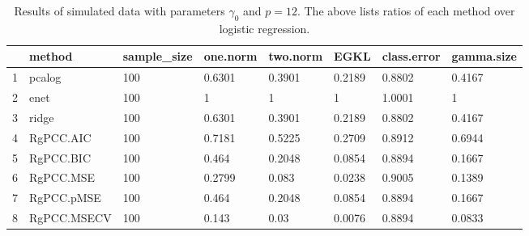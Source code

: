 \begin{table}[ht]
\centering
\begin{tabular}{rlllllll}
  \hline
 & method & sample\_size & one.norm & two.norm & EGKL & class.error & gamma.size \\ 
  \hline
1 & pcalog & 100 & 0.6301 & 0.3901 & 0.2189 & 0.8802 & 0.4167 \\ 
  2 & enet & 100 & 1 & 1 & 1 & 1.0001 & 1 \\ 
  3 & ridge & 100 & 0.6301 & 0.3901 & 0.2189 & 0.8802 & 0.4167 \\ 
  4 & RgPCC.AIC & 100 & 0.7181 & 0.5225 & 0.2709 & 0.8912 & 0.6944 \\ 
  5 & RgPCC.BIC & 100 & 0.464 & 0.2048 & 0.0854 & 0.8894 & 0.1667 \\ 
  6 & RgPCC.MSE & 100 & 0.2799 & 0.083 & 0.0238 & 0.9005 & 0.1389 \\ 
  7 & RgPCC.pMSE & 100 & 0.464 & 0.2048 & 0.0854 & 0.8894 & 0.1667 \\ 
  8 & RgPCC.MSECV & 100 & 0.143 & 0.03 & 0.0076 & 0.8894 & 0.0833 \\ 
   \hline
\end{tabular}
\caption{Results of simulated data with parameters $\gamma_0$ and $p =12$. The above lists ratios of each method over logistic regression.} 
\label{fig-0-debug-new-algo-12-metrics-pratio}
\end{table}
